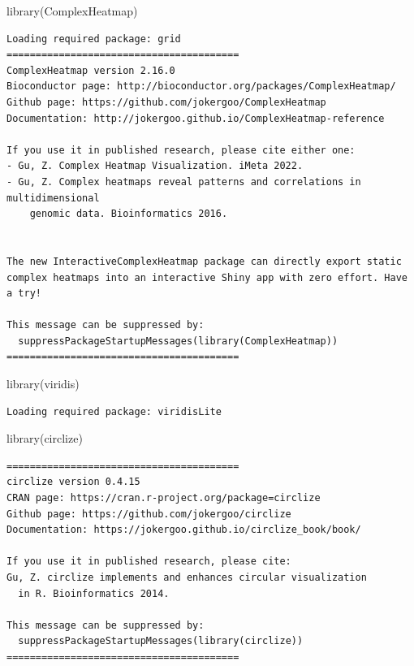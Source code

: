 \documentclass[
  letterpaper,
  DIV=11,
  numbers=noendperiod]{scrreprt}
\newenvironment{Shaded}{\begin{snugshade}}{\end{snugshade}}
\newcommand{\FunctionTok}[1]{\textcolor[rgb]{0.28,0.35,0.67}{#1}}
\newcommand{\NormalTok}[1]{\textcolor[rgb]{0.00,0.23,0.31}{#1}}
\begin{document}
\begin{Shaded}
\begin{Highlighting}[]
\FunctionTok{library}\NormalTok{(ComplexHeatmap)}
\end{Highlighting}
\end{Shaded}

\begin{verbatim}
Loading required package: grid
========================================
ComplexHeatmap version 2.16.0
Bioconductor page: http://bioconductor.org/packages/ComplexHeatmap/
Github page: https://github.com/jokergoo/ComplexHeatmap
Documentation: http://jokergoo.github.io/ComplexHeatmap-reference

If you use it in published research, please cite either one:
- Gu, Z. Complex Heatmap Visualization. iMeta 2022.
- Gu, Z. Complex heatmaps reveal patterns and correlations in multidimensional 
    genomic data. Bioinformatics 2016.


The new InteractiveComplexHeatmap package can directly export static 
complex heatmaps into an interactive Shiny app with zero effort. Have a try!

This message can be suppressed by:
  suppressPackageStartupMessages(library(ComplexHeatmap))
========================================
\end{verbatim}

\begin{Shaded}
\begin{Highlighting}[]
\FunctionTok{library}\NormalTok{(viridis)}
\end{Highlighting}
\end{Shaded}

\begin{verbatim}
Loading required package: viridisLite
\end{verbatim}

\begin{Shaded}
\begin{Highlighting}[]
\FunctionTok{library}\NormalTok{(circlize)}
\end{Highlighting}
\end{Shaded}

\begin{verbatim}
========================================
circlize version 0.4.15
CRAN page: https://cran.r-project.org/package=circlize
Github page: https://github.com/jokergoo/circlize
Documentation: https://jokergoo.github.io/circlize_book/book/

If you use it in published research, please cite:
Gu, Z. circlize implements and enhances circular visualization
  in R. Bioinformatics 2014.

This message can be suppressed by:
  suppressPackageStartupMessages(library(circlize))
========================================
\end{verbatim}
\end{document}
